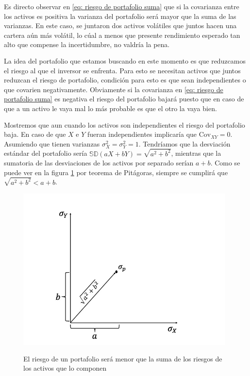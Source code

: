 Es directo observar en \ref{eq: riesgo de portafolio suma} que si la covarianza entre los activos es positiva la varianza del portafolio será mayor que la suma de las varianzas. En este caso, se juntaron dos activos volátiles que juntos hacen una cartera aún más volátil, lo cúal a menos que presente rendimiento esperado tan alto que compense la incertidumbre, no valdría la pena. 

La idea del portafolio que estamos buscando en este momento es que reduzcamos el riesgo al que el inversor se enfrenta. Para esto se necesitan activos que juntos reduzcan el riesgo de portafolio, condición para esto es que sean independientes o que covarien negativamente. Obviamente si la covarianza en \ref{eq: riesgo de portafolio suma} es negativa el riesgo del portafolio bajará puesto que en caso de que a un activo le vaya mal lo más probable es que el otro la vaya bien.

Mostremos que aun cuando los activos son independientes el riesgo del portafolio baja. En caso de que $X$ e $Y$ fueran independientes implicaría que $\text{Cov}_{XY}= 0$. Asumiendo que tienen varianzas $\sigma_X^2 = \sigma^2_Y = 1$. Tendríamos que la desviación estándar del portafolio sería $\mathbb{SD}(aX + bY) = \sqrt{a^2 + b^2}$, mientras que la sumatoria de las desviaciones de los activos por separado serían $a+b$. Como se puede ver en la figura \ref{fig: Diversificación del riesgo con dos activos} por teorema de Pitágoras, siempre se cumplirá que $\sqrt{a^2 + b^2} < a+b$.

\begin{figure}[ht]
    \centering
    \caption{El riesgo de un portafolio será menor que la suma de los riesgos de los activos que lo componen}
    \includegraphics[width=11cm]{Figuras/Riesgo de un portafolio y reduccion de riesgo.jpeg}
    \label{fig: Diversificación del riesgo con dos activos}
\end{figure}

